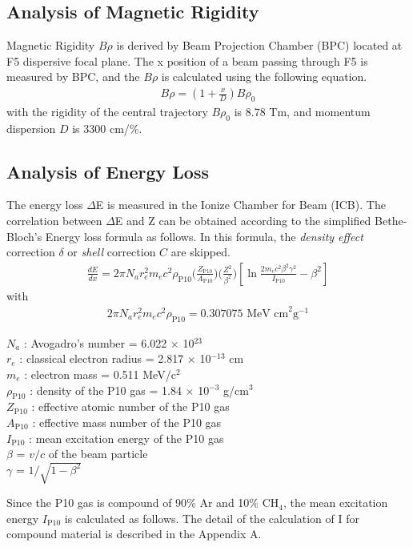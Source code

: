 \subsection{Analysis of Magnetic Rigidity}
Magnetic Rigidity $B\rho$ is derived by Beam Projection Chamber (BPC) located at F5 dispersive focal plane. The x position of a beam passing through F5 is measured by BPC, and the $B\rho$ is calculated using the following equation.
    \begin{align}
        B\rho = (1+\frac{x}{D}) B\rho_{0} 
    \end{align}
with the rigidity of the central trajectory $B\rho_{0}$ is 8.78 Tm, and  momentum dispersion $D$ is 3300 cm/$\%$. 

\subsection{Analysis of Energy Loss}
The energy loss $\Delta$E is measured in the Ionize Chamber for Beam (ICB). The correlation between $\Delta$E and Z can be obtained according to the simplified Bethe-Bloch's Energy loss formula as follows. In this formula, the \textit{density effect} correction $\delta$ or \textit{shell} correction $C$ are skipped.
    \begin{align}
        \frac{dE}{dx} = 2\pi N_{a} r_{e}^{2} m_{e} c^{2} \rho_{\text{P10}} 
        \bigg( \frac{Z_{\text{P10}}}{A_{\text{P10}}} \bigg) \bigg( \frac{Z^{2}}{\beta^{2}} \bigg) 
        \left[ \ln \frac{2m_{e}c^{2}\beta^{2}\gamma^{2}}{I_{\text{P10}}} - \beta^{2}  \right]
    \end{align}
with
    \begin{align}
        2 \pi N_{a} r_{e}^{2} m_{e} c^{2} \rho_{\text{P10}} = 0.307075 \text{ MeV cm}^{2} \text{g}^{-1} 
    \end{align}
    \begin{adjustwidth}{1cm}{}
        $N_{a}$ : Avogadro's number = 6.022 $\times$ 10$^{23}$\\
        $r_{e}$ : classical electron radius = 2.817 $\times$ 10$^{-13}$ cm\\ 
        $m_{e}$ : electron mass = 0.511 MeV/c$^{2}$\\
        $\rho_{\text{P10}}$ : density of the P10 gas = 1.84 $\times$ 10$^{-3}$ g/cm$^{3}$\\
        $Z_{\text{P10}}$ : effective atomic number of the P10 gas\\
        $A_{\text{P10}}$ : effective mass number of the P10 gas\\
        $I_{\text{P10}}$ : mean excitation energy of the P10 gas\\ 
        $\beta$ = $v / c$ of the beam particle\\
        $\gamma$ = $1 / \sqrt{1-\beta^{2}}$
    \end{adjustwidth}
\vspace{3mm}
Since the P10 gas is compound of 90$\%$ Ar and 10$\%$ CH$_{4}$, the mean excitation energy $I_{\text{P10}}$ is calculated as follows. The detail of the calculation of I for compound material is described in the Appendix A.

